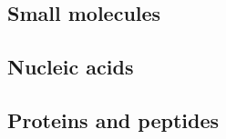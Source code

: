 \subsection{Small molecules}

\subsection{Nucleic acids}

\subsection{Proteins and peptides}








\cleardoublepage

